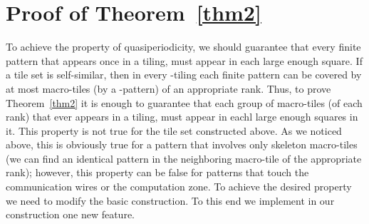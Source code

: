 \documentclass[runningheads]{llncs}
\begin{document}
\section{Proof of Theorem~\ref{thm2}}

To achieve the property of quasiperiodicity, we should guarantee  that every finite pattern that appears once in a tiling, must appear in each large enough square.  If a tile set  is self-similar, then in every -tiling  each finite pattern  can be covered by at most   macro-tiles  (by a -pattern)  of an appropriate rank. Thus, to prove Theorem~\ref{thm2} it is enough to guarantee that each  group of macro-tiles (of each rank) that ever appears in a tiling, must appear  in eachl large enough squares in it. This property is not true for the tile set constructed above. As we noticed above, this is obviously true for a  pattern that involves only skeleton macro-tiles (we can find an identical pattern in the neighboring macro-tile of the appropriate rank); however, this property can be false for patterns that touch the communication wires or the computation zone.
To achieve the desired property we need to modify  the basic construction. To this end we implement in our construction one new feature.
\end{document}
